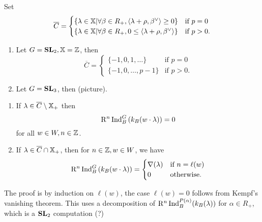 Set
\[
\overline{C} = \begin{cases}
	\left\{ \lambda\in \mathbb{X} \middle| \forall \beta\in R_+, \left<\lambda+\rho,\beta^{\vee} \right> \ge 0 \right\} & \text{if }p=0 \\
	\left\{ \lambda\in \mathbb{X} \middle| \forall \beta\in R_+, 0\le \left<\lambda+\rho,\beta^{\vee} \right> \right\} & \text{if }p>0.
\end{cases}
\] 
\begin{example}\leavevmode
	\begin{enumerate}[(1)]
		\item Let $G=\mathbf{SL}_2, \mathbb{X}=\mathbb Z$, then
			\[
			\overline{C} = \begin{cases}
				\{ -1,0,1,\dots \} & \text{if }p=0 \\
				\{ -1,0,\dots,p-1 \} & \text{if }p>0.
			\end{cases}
			\] 
		\item Let $G=\mathbf{SL}_3$, then (picture).
	\end{enumerate}
\end{example}
\begin{theorem}\leavevmode
	\begin{enumerate}[(1)]
		\item If $\lambda\in \overline{C}\setminus \mathbb{X}_+$ then
			\[
			\mathrm{R}^{n}\operatorname{Ind}_B^{G}\left( k_B(w\cdot \lambda) \right) = 0
			\] 
			for all $w\in W, n\in \mathbb Z$.
		\item If $\lambda\in \overline{C}\cap \mathbb{X}_+$, then for $n\in \mathbb Z, w\in W$, we have
			\[
			\mathrm{R}^{n}\operatorname{Ind}_B^{G}\left( k_B(w\cdot \lambda) \right) = \begin{cases}
				\nabla(\lambda) & \text{if }n=\ell(w) \\
				0 & \text{otherwise}.
			\end{cases}
			\] 
	\end{enumerate}
\end{theorem}
The proof is by induction on $\ell(w)$, the case $\ell(w)=0$ follows from Kempf's vanishing theorem. This uses a decomposition of $\mathrm{R}^{n}\operatorname{Ind}_B^{P(\alpha)}(k_B(\lambda))$ for $\alpha\in R_+$, which is a $\mathbf{SL}_2$ computation (?)

